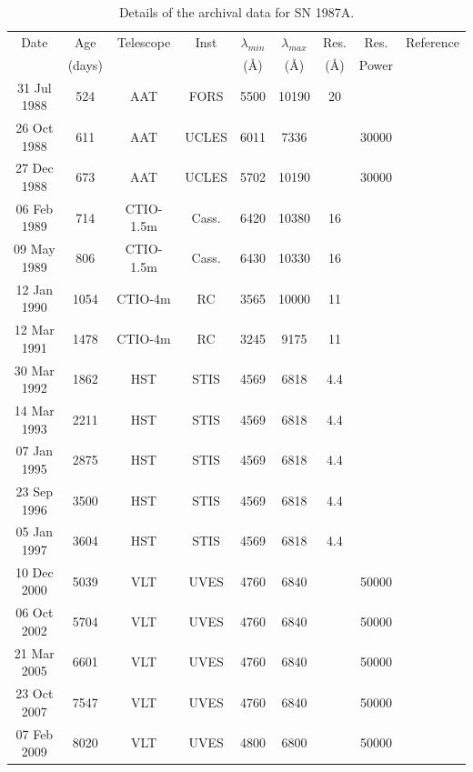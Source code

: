 \setlength{\tabcolsep}{5pt}
\begin{landscape}
\begin{table}[hbtp]
	\begin{minipage}{180mm}
	\caption{Details of the archival data for SN 1987A.}
	\label{tb:data}
  	\begin{tabular}{@{} ccccccccl @{}}
    	\hline
	Date & Age & Telescope  & Inst & $\lambda_{min}$ & $\lambda_{max}$ & Res. & Res. & Reference \\
	& (days) & & &(\AA) & (\AA)& (\AA) & Power\\
	\hline
31 Jul 1988 & 524 & AAT & FORS & 5500 & 10190 & 20 & & \citet{Spyromilio1991} \\
26 Oct 1988 & 611 & AAT & UCLES & 6011 & 7336 &  & 30000 & \citet{Hanuschik1993, Spyromilio1993}\\
27 Dec 1988 & 673 & AAT & UCLES & 5702 & 10190 &  & 30000 & \citet{Hanuschik1993, Spyromilio1993}\\
06 Feb 1989 & 714 & CTIO-1.5m & Cass. & 6420 & 10380 & 16 & & \citet{Phillips1990}\\
09 May 1989 & 806 & CTIO-1.5m & Cass. & 6430 & 10330 & 16 & & \citet{Phillips1990}\\
12 Jan 1990 & 1054 & CTIO-4m & RC & 3565 & 10000 & 11 & & \cite{Suntzeff1991} \\
12 Mar 1991 & 1478 & CTIO-4m & RC & 3245 & 9175 & 11 & & \\
30 Mar 1992 & 1862 & HST & STIS & 4569 & 6818 & 4.4 &  & \citet{Wang1996}\\
14 Mar 1993 & 2211 & HST & STIS & 4569 & 6818 & 4.4 &  & \citet{Wang1996}\\
07 Jan 1995 & 2875 & HST & STIS & 4569 & 6818 & 4.4 &  & \citet{Chugai1997}\\
23 Sep 1996 & 3500 & HST & STIS & 4569 & 6818 & 4.4 &  \\ 
05 Jan 1997 & 3604 & HST & STIS & 4569 & 6818 & 4.4 &  \\
10 Dec 2000 & 5039 & VLT & UVES & 4760 & 6840 &  & 50000 & \citet{Groeningsson2006, Groeningsson2007}\\
06 Oct 2002 & 5704 & VLT & UVES & 4760 & 6840 &  & 50000 & \citet{Groeningsson2006, Groeningsson2007, Groningsson2008}\\
21 Mar 2005 & 6601 & VLT & UVES & 4760 & 6840 &  & 50000 &\citet{Groeningsson2006, Groeningsson2007}\\
23 Oct 2007 & 7547 & VLT & UVES & 4760 & 6840 &  & 50000 & \citet{Groeningsson2007}\\
07 Feb 2009 & 8020 & VLT & UVES & 4800 & 6800 &  & 50000 & \citet{Tziamtzis2010}\\
    \hline
  \end{tabular}
\end{minipage}
\end{table}
\end{landscape}
\setlength{\tabcolsep}{12pt}


